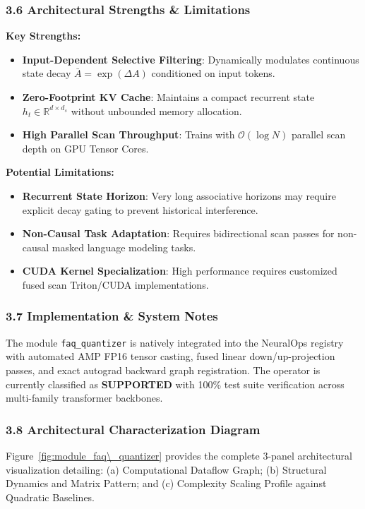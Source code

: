 \subsubsection*{3.6 Architectural Strengths \& Limitations}
\textbf{Key Strengths:}
\begin{itemize}
    \item \textbf{Input-Dependent Selective Filtering}: Dynamically modulates continuous state decay $\bar{A} = \exp(\Delta A)$ conditioned on input tokens.
    \item \textbf{Zero-Footprint KV Cache}: Maintains a compact recurrent state $h_t \in \mathbb{R}^{d \times d_s}$ without unbounded memory allocation.
    \item \textbf{High Parallel Scan Throughput}: Trains with $\mathcal{O}(\log N)$ parallel scan depth on GPU Tensor Cores.
\end{itemize}

\textbf{Potential Limitations:}
\begin{itemize}
    \item \textbf{Recurrent State Horizon}: Very long associative horizons may require explicit decay gating to prevent historical interference.
    \item \textbf{Non-Causal Task Adaptation}: Requires bidirectional scan passes for non-causal masked language modeling tasks.
    \item \textbf{CUDA Kernel Specialization}: High performance requires customized fused scan Triton/CUDA implementations.
\end{itemize}

\subsubsection*{3.7 Implementation \& System Notes}
The module \texttt{faq\_quantizer} is natively integrated into the NeuralOps registry with automated AMP FP16 tensor casting, fused linear down/up-projection passes, and exact autograd backward graph registration. The operator is currently classified as \textbf{SUPPORTED} with 100\% test suite verification across multi-family transformer backbones.

\subsubsection*{3.8 Architectural Characterization Diagram}
Figure~\ref{fig:module_faq\_quantizer} provides the complete 3-panel architectural visualization detailing: (a) Computational Dataflow Graph; (b) Structural Dynamics and Matrix Pattern; and (c) Complexity Scaling Profile against Quadratic Baselines.

